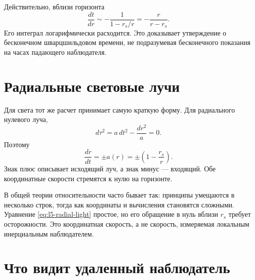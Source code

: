 Действительно, вблизи горизонта
\begin{equation}
\frac{dt}{dr}
\sim-\frac{1}{1-r_s/r}
=-\frac{r}{r-r_s}.
\end{equation}
Его интеграл логарифмически расходится. Это доказывает утверждение о бесконечном шварцшильдовом времени, не подразумевая бесконечного показания на часах падающего наблюдателя.

\section{Радиальные световые лучи}

Для света тот же расчет принимает самую краткую форму. Для радиального нулевого луча,
\begin{equation}
d\tau^2
=a\,dt^2-\frac{dr^2}{a}=0.
\end{equation}
Поэтому
\begin{equation}
\boxed{
\frac{dr}{dt}
=\pm a(r)
=\pm\left(1-\frac{r_s}{r}\right).
}
\label{eq:l5-radial-light}
\end{equation}
Знак плюс описывает исходящий луч, а знак минус — входящий. Обе координатные скорости стремятся к нулю на горизонте.

\begin{classroomqa}
\end{classroomqa}

В общей теории относительности часто бывает так: принципы умещаются в несколько строк, тогда как координаты и вычисления становятся сложными. Уравнение
\eqref{eq:l5-radial-light} простое, но его обращение в нуль вблизи
\(r_s\) требует осторожности. Это координатная скорость, а не скорость, измеряемая локальным инерциальным наблюдателем.

\section{Что видит удаленный наблюдатель}

\begin{classroomqa}
\end{classroomqa}


